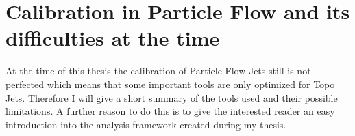 



\section{Calibration in Particle Flow and its difficulties at the time}

At the time of this thesis the calibration of Particle Flow Jets still is not perfected which means that some important tools are only optimized for Topo Jets. Therefore I will give a short summary of the tools used and their possible limitations. A further reason to do this is to give the interested reader an easy introduction into the analysis framework created during my thesis.

